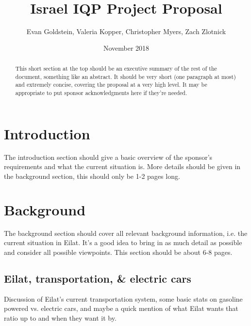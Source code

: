 \documentclass{article}
\title{Israel IQP Project Proposal}
\author{Evan Goldstein, Valeria Kopper, Christopher Myers, Zach Zlotnick}
\date{November 2018}
\begin{document}
\maketitle

\renewcommand\abstractname{Summary} %
\begin{abstract}
    \singlespacing
    This short section at the top should be an executive summary of the rest of the document, something like an
    abstract. It should be very short (one paragraph at most) and extremely concise, covering the proposal at a
    very high level. It may be appropriate to put sponsor acknowledgments here if they're needed.
\end{abstract}

\tableofcontents
\newpage
{}


\section{Introduction}

The introduction section should give a basic overview of the sponsor's requirements and what the current situation
is. More details should be given in the background section, this should only be 1-2 pages long.

\newpage
\section{Background}

The background section should cover all relevant background information, i.e. the current situation in Eilat.
It's a good idea to bring in as much detail as possible and consider all possible viewpoints. This section should
be about 6-8 pages.

\subsection{Eilat, transportation, \& electric cars}
Discussion of Eilat's current transportation system, some basic stats on gasoline powered vs. electric cars,
and maybe a quick mention of what Eilat wants that ratio up to and when they want it by.
\end{document}
